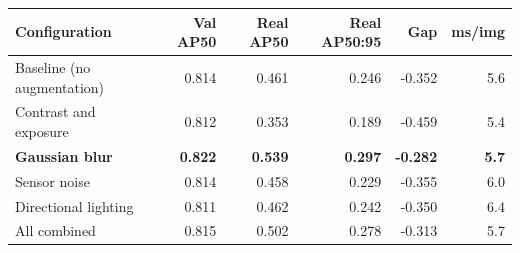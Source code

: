\begin{tabular}{lrrrrr}
\toprule
Configuration & Val AP50 & Real AP50 & Real AP50:95 & Gap & ms/img \\
\midrule
Baseline (no augmentation) & 0.814 & 0.461 & 0.246 & -0.352 & 5.6 \\
Contrast and exposure & 0.812 & 0.353 & 0.189 & -0.459 & 5.4 \\
\textbf{Gaussian blur} & \textbf{0.822} & \textbf{0.539} & \textbf{0.297} & \textbf{-0.282} & \textbf{5.7} \\
Sensor noise & 0.814 & 0.458 & 0.229 & -0.355 & 6.0 \\
Directional lighting & 0.811 & 0.462 & 0.242 & -0.350 & 6.4 \\
All combined & 0.815 & 0.502 & 0.278 & -0.313 & 5.7 \\
\bottomrule
\end{tabular}

